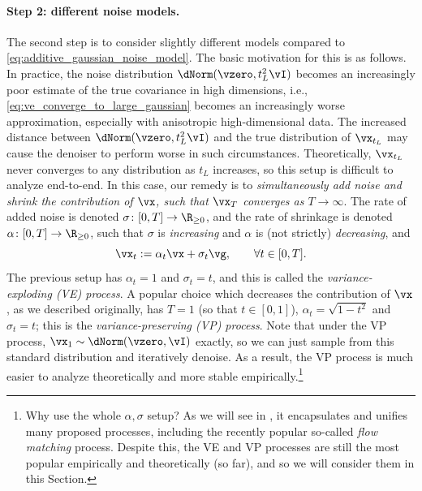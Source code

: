 \documentclass[../../book-main.tex]{subfiles}
\begin{document}
\paragraph{Step 2: different noise models.} The second step is to consider slightly different models compared to \eqref{eq:additive_gaussian_noise_model}. The basic motivation for this is as follows. In practice, the noise distribution \(\dNorm(\vzero, t_{L}^{2}\vI)\) becomes an increasingly poor estimate of the true covariance in high dimensions, i.e., \eqref{eq:ve_converge_to_large_gaussian} becomes an increasingly worse approximation, especially with anisotropic high-dimensional data. The increased distance between \(\dNorm(\vzero, t_{L}^{2}\vI)\) and the true distribution of \(\vx_{t_{L}}\) may cause the denoiser to perform worse in such circumstances. Theoretically, \(\vx_{t_{L}}\) never converges to any distribution as \(t_{L}\) increases, so this setup is difficult to analyze end-to-end. In this case, our remedy is to \textit{simultaneously add noise and shrink the contribution of \(\vx\), such that \(\vx_{T}\) converges as \(T \to \infty\)}. The rate of added noise is denoted \(\sigma \colon [0, T] \to \R_{\geq 0}\), and the rate of shrinkage is denoted \(\alpha \colon [0, T] \to \R_{\geq 0}\), such that \(\sigma\) is \textit{increasing} and \(\alpha\) is (not strictly) \textit{decreasing}, and 
\begin{equation}\label{eq:gen_additive_gaussian_noise_model}
	\vx_{t} := \alpha_{t}\vx + \sigma_{t}\vg, \qquad \forall t \in [0, T].
\end{equation}
The previous setup has \(\alpha_{t} = 1\) and \(\sigma_{t} = t\), and this is called the \textit{variance-exploding (VE) process}. A popular choice which decreases the contribution of \(\vx\), as we described originally, has \(T = 1\) (so that \(t \in [0, 1]\)), \(\alpha_{t} = \sqrt{1 - t^{2}}\) and \(\sigma_{t} = t\); this is the \textit{variance-preserving (VP) process}. Note that under the VP process, \(\vx_{1} \sim \dNorm(\vzero, \vI)\) exactly, so we can just sample from this standard distribution and iteratively denoise. As a result, the VP process is much easier to analyze theoretically and more stable empirically.\footnote{Why use the whole \(\alpha, \sigma\) setup? As we will see in , it encapsulates and unifies many proposed processes, including the recently popular so-called \textit{flow matching} process. Despite this, the VE and VP processes are still the most popular empirically and theoretically (so far), and so we will consider them in this Section.} 
\end{document}
